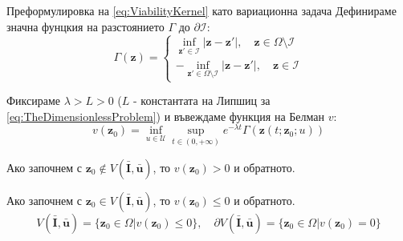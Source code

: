 \begin{frame}[t]{Преформулировка на \eqref{eq:ViabilityKernel} като вариационна задача}
  Дефинираме значна фунцкия на разстоянието $\Gamma$ до $\partial \mathscr{I}$:
  \begin{equation}
    \Gamma(\boldsymbol{z}) =
    \begin{cases}
      \inf_{\boldsymbol{z}' \in \mathscr{I}} |\boldsymbol{z}-\boldsymbol{z}'|, \quad \boldsymbol{z} \in \Omega \setminus \mathscr{I} \\
      -\inf_{\boldsymbol{z}' \in \Omega \setminus \mathscr{I}} |\boldsymbol{z}-\boldsymbol{z}'|, \quad \boldsymbol{z} \in \mathscr{I}
    \end{cases}
  \end{equation}

  Фиксираме $\lambda>L>0$ ($L$ - константата на Липшиц за \eqref{eq:TheDimensionlessProblem}) и въвеждаме функция на Белман $v$:
  \begin{equation}
    v(\boldsymbol{z}_0) = \inf_{u \in \mathscr{U}} \sup_{t \in (0, +\infty)} e^{-\lambda t} \Gamma(\boldsymbol{z}(t; \boldsymbol{z}_0; u))
  \end{equation}

  Ако започнем с $\boldsymbol{z}_0 \notin V(\bar{\boldsymbol{I}}, \bar{\boldsymbol{u}})$, то $v(\boldsymbol{z}_0) > 0$ и обратното.

  Ако започнем с $\boldsymbol{z}_0 \in V(\bar{\boldsymbol{I}}, \bar{\boldsymbol{u}})$, то $v(\boldsymbol{z}_0) \leq 0$ и обратното.
  \begin{equation*}
    V(\bar{\boldsymbol{I}}, \bar{\boldsymbol{u}}) = \{\boldsymbol{z}_0 \in \Omega \vert v(\boldsymbol{z}_0) \leq 0\}, \quad \partial V(\bar{\boldsymbol{I}}, \bar{\boldsymbol{u}}) = \{\boldsymbol{z}_0 \in \Omega \vert v(\boldsymbol{z}_0) = 0\}
  \end{equation*}
\end{frame}

